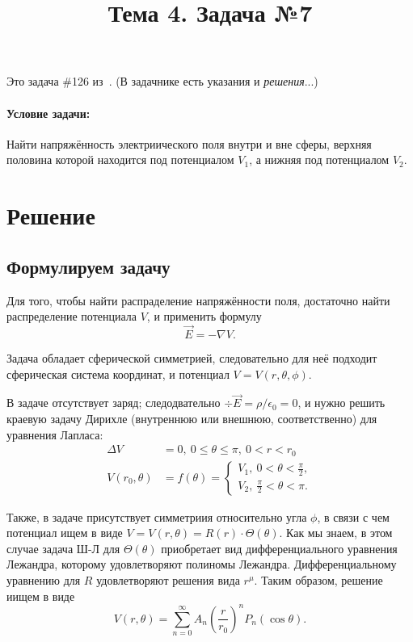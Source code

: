 \documentclass{report}
\title{Тема 4. Задача №7}
\begin{document}
	\maketitle
	
\begin{rmk}
	Это задача \#126 из~\cite[стр.~83]{Budak}. (В задачнике есть указания и \emph{решения}...)
\end{rmk}
\paragraph{Условие задачи:} Найти напряжённость электриического поля внутри и вне сферы, верхняя половина которой находится под потенциалом $V_1$, а нижняя под потенциалом $V_2$.

\section{Решение}
\subsection{Формулируем задачу}
Для того, чтобы найти распраделение напряжённости поля, достаточно найти распределение потенциала $V$, и применить формулу 
\[
\vec E = -\nabla V.
\]

Задача обладает сферической симметрией, следовательно для неё подходит сферическая система координат, и потенциал $V = V(r,\theta,\phi)$.

В задаче отсутствует заряд; следодвательно $\div \vec{E} = \rho/\epsilon_0 = 0$, и нужно решить краевую задачу Дирихле (внутреннюю или внешнюю, соответственно) для уравнения Лапласа:
\begin{align*}
	\Delta V &= 0, ~ 0 \le \theta \le \pi, ~ 0 < r< r_0\\
	V(r_0, \theta) &= f(\theta) =\begin{cases}
		 V_1,~ 0 < \theta < \frac{\pi}{2},\\
		 V_2,~ \frac{\pi}{2} < \theta< \pi.
	\end{cases}
\end{align*}

Также, в задаче присутствует симметриия относительно угла $\phi$, в связи с чем потенциал ищем в виде $V = V(r, \theta) = R(r)\cdot \Theta(\theta)$. Как мы знаем, в этом случае задача Ш-Л для $\Theta(\theta)$ приобретает вид дифференциального уравнения Лежандра, которому удовлетворяют полиномы Лежандра. Дифференциальному уравнению для $R$ удовлетворяют решения вида $r^\mu$. Таким образом, решение иищем в виде
\[
V(r, \theta) = \sum_{n=0}^\infty A_n \left(\frac{r}{r_0}\right)^n P_n(\cos \theta).
\]
\end{document}
